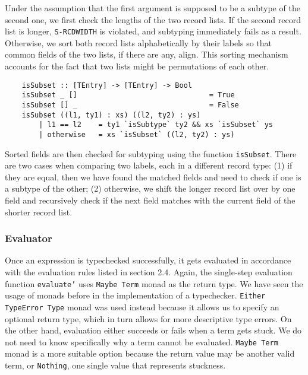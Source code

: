 \documentclass[fleqn, 11pt]{article}
\begin{document}
Under the assumption that the first argument is supposed to be a subtype of the second one, we first check the lengths of the two 
record lists. If the second record list is longer, \texttt{S-RCDWIDTH} is violated, and subtyping immediately fails as a result. 
Otherwise, we sort both record lists alphabetically by their labels so that common fields of the two lists, if there are any, align. 
This sorting mechanism accounts for the fact that two lists might be permutations of each other.

\begin{Verbatim}
    isSubset :: [TEntry] -> [TEntry] -> Bool
    isSubset _ []                               = True
    isSubset [] _                               = False
    isSubset ((l1, ty1) : xs) ((l2, ty2) : ys) 
        | l1 == l2    = ty1 `isSubtype` ty2 && xs `isSubset` ys
        | otherwise   = xs `isSubset` ((l2, ty2) : ys)
\end{Verbatim}

Sorted fields are then checked for subtyping using the function \texttt{isSubset}. There are two cases when comparing two labels, each 
in a different record type: (1) if they are equal, then we have found the matched fields and need to check if one is a subtype of 
the other; (2) otherwise, we shift the longer record list over by one field and recursively check if the next field matches with the 
current field of the shorter record list.

\subsubsection{Evaluator}

Once an expression is typechecked successfully, it gets evaluated in accordance with the evaluation rules listed in section 2.4. 
Again, the single-step evaluation function \texttt{evaluate'} uses \texttt{Maybe Term} monad as the return type. We have seen 
the usage of monads before in the implementation of a typechecker. \texttt{Either TypeError Type} monad was used instead because it allows us 
to specify an optional return type, which in turn allows for more descriptive type errors. On the other hand, evaluation either 
succeeds or fails when a term gets stuck. We do not need to know specifically why a term cannot be evaluated. \texttt{Maybe Term} 
monad is a more suitable option because the return value may be another valid term, or \texttt{Nothing}, one single value that 
represents stuckness.
\end{document}
